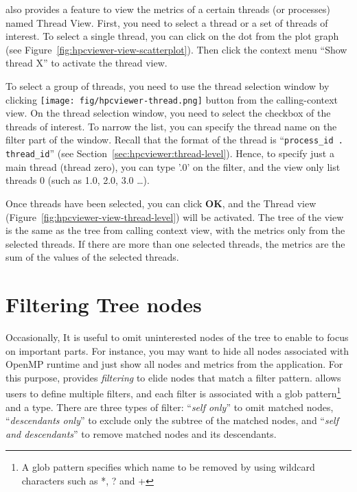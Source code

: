 \hpcviewer{} also provides a feature to view the metrics of a certain threads (or processes) named Thread View.
First, you need to select a thread or a set of threads of interest.
To select a single thread, you can click on the dot from the plot graph (see Figure~\ref{fig:hpcviewer-view-scatterplot}).
Then click the context menu ``Show thread X'' to activate the thread view.

To select a group of threads, you need to use the thread selection window by clicking \texttt{[image: fig/hpcviewer-thread.png]} button from the calling-context view.
On the thread selection window, you need to select the checkbox of the threads of interest. 
To  narrow the list, you can specify the thread name on the filter part of the window.
Recall that the format of the thread is ``\texttt{process\_id . thread\_id}'' (see Section~\ref{sec:hpcviewer:thread-level}).
Hence, to specify just a main thread (thread zero), you can type '.0' on the filter, and the view only list threads 0 (such as 1.0, 2.0, 3.0 \dots).

Once threads have been selected, you can click \textbf{OK}, and the Thread view (Figure~\ref{fig:hpcviewer-view-thread-level}) will be activated. 
The tree of the view is the same as the tree from calling context view, with the metrics only from the selected threads.
If there are more than one selected threads, the metrics are the sum of the values of the selected threads.


\section{Filtering Tree nodes}
\label{sec:filter}
Occasionally, It is useful to omit uninterested nodes of the tree to enable to focus on important parts. 
For instance, you may want to hide all nodes associated with OpenMP runtime and just show all nodes and metrics from the application. 
For this purpose, \hpcviewer{} provides \emph{filtering} to elide nodes that match a filter pattern.
\hpcviewer{} allows  users to define multiple filters, and each filter is associated with a glob pattern\footnote{A glob pattern specifies which name to be removed by using wildcard characters such as *, ? and +} and a type.
There are three types of filter: ``\emph{self only}'' to omit matched nodes, 
``\emph{descendants only}'' to exclude only the subtree of the matched nodes, and ``\emph{self and descendants}'' to
remove matched nodes and its descendants.

